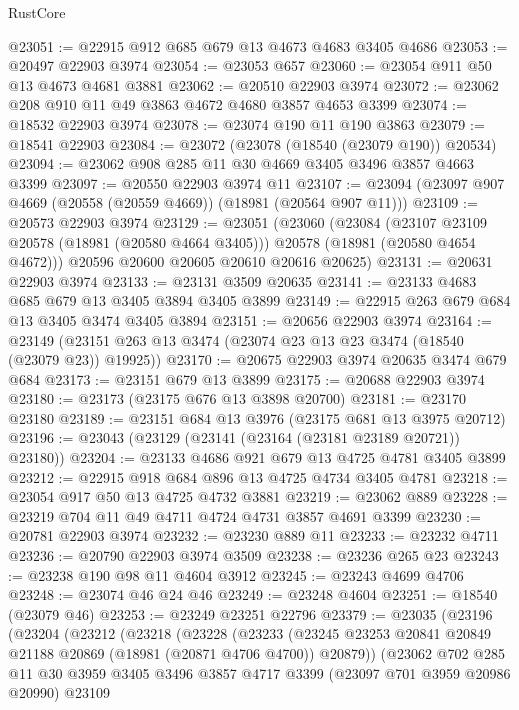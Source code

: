 \begin{lexlean}{RustCore}
\begin{coremodule}
@23051 := @22915 @912 @685 @679 @13 @4673 @4683 @3405 @4686
@23053 := @20497 @22903 @3974
@23054 := @23053 @657
@23060 := @23054 @911 @50 @13 @4673 @4681 @3881
@23062 := @20510 @22903 @3974
@23072 := @23062 @208 @910 @11 @49 @3863 @4672 @4680 @3857 @4653 @3399
@23074 := @18532 @22903 @3974
@23078 := @23074 @190 @11 @190 @3863
@23079 := @18541 @22903
@23084 := @23072 (@23078 (@18540 (@23079 @190)) @20534)
@23094 := @23062 @908 @285 @11 @30 @4669 @3405 @3496 @3857 @4663 @3399
@23097 := @20550 @22903 @3974 @11
@23107 := @23094 (@23097 @907 @4669 (@20558 (@20559 @4669)) (@18981 (@20564 @907 @11)))
@23109 := @20573 @22903 @3974
@23129 := @23051
    (@23060
      (@23084
        (@23107 @23109 @20578 (@18981 (@20580 @4664 @3405)))
        @20578
        (@18981 (@20580 @4654 @4672)))
      @20596
      @20600
      @20605
      @20610
      @20616
      @20625)
@23131 := @20631 @22903 @3974
@23133 := @23131 @3509 @20635
@23141 := @23133 @4683 @685 @679 @13 @3405 @3894 @3405 @3899
@23149 := @22915 @263 @679 @684 @13 @3405 @3474 @3405 @3894
@23151 := @20656 @22903 @3974
@23164 := @23149 (@23151 @263 @13 @3474 (@23074 @23 @13 @23 @3474 (@18540 (@23079 @23)) @19925))
@23170 := @20675 @22903 @3974 @20635 @3474 @679 @684
@23173 := @23151 @679 @13 @3899
@23175 := @20688 @22903 @3974
@23180 := @23173 (@23175 @676 @13 @3898 @20700)
@23181 := @23170 @23180
@23189 := @23151 @684 @13 @3976 (@23175 @681 @13 @3975 @20712)
@23196 := @23043 (@23129 (@23141 (@23164 (@23181 @23189 @20721)) @23180))
@23204 := @23133 @4686 @921 @679 @13 @4725 @4781 @3405 @3899
@23212 := @22915 @918 @684 @896 @13 @4725 @4734 @3405 @4781
@23218 := @23054 @917 @50 @13 @4725 @4732 @3881
@23219 := @23062 @889
@23228 := @23219 @704 @11 @49 @4711 @4724 @4731 @3857 @4691 @3399
@23230 := @20781 @22903 @3974
@23232 := @23230 @889 @11
@23233 := @23232 @4711
@23236 := @20790 @22903 @3974 @3509
@23238 := @23236 @265 @23
@23243 := @23238 @190 @98 @11 @4604 @3912
@23245 := @23243 @4699 @4706
@23248 := @23074 @46 @24 @46
@23249 := @23248 @4604
@23251 := @18540 (@23079 @46)
@23253 := @23249 @23251 @22796
@23379 := @23035
    (@23196
      (@23204
        (@23212
          (@23218
            (@23228
              (@23233
                (@23245 @23253 @20841 @20849 @21188 @20869 (@18981 (@20871 @4706 @4700)) @20879))
              (@23062
                @702
                @285
                @11
                @30
                @3959
                @3405
                @3496
                @3857
                @4717
                @3399
                (@23097 @701 @3959 @20986 @20990)
                @23109

\end{coremodule}
\end{lexlean}
